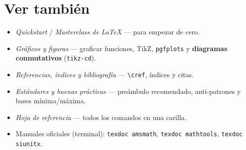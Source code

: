 \documentclass[11pt,a4paper]{article}
\newcommand{\C}[1]{\texttt{\textbackslash #1}}   %
\theoremstyle{plain}      %
\theoremstyle{definition} %
\theoremstyle{remark}
\begin{document}
\section*{Ver también}
\begin{itemize}[noitemsep]
  \item \emph{Quickstart} / \emph{Masterclass de \LaTeX} — para empezar de cero.
  \item \emph{Gráficos y figuras} — graficar funciones, TikZ, \texttt{pgfplots}
        y \textbf{diagramas conmutativos} (\texttt{tikz-cd}).
  \item \emph{Referencias, índices y bibliografía} — \C{cref}, índices y citas.
  \item \emph{Estándares y buenas prácticas} — preámbulo recomendado,
        anti-patrones y bases mínima/máxima.
  \item \emph{Hoja de referencia} — todos los comandos en una carilla.
  \item Manuales oficiales (terminal): \texttt{texdoc amsmath},
        \texttt{texdoc mathtools}, \texttt{texdoc siunitx}.
\end{itemize}
\end{document}
